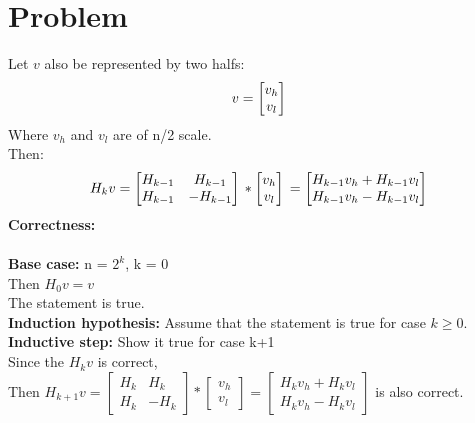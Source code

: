 \documentclass{article}
\begin{document}
\section{Problem \uppercase\expandafter{}}
Let $v$ also be represented by two halfs:\\
$$
v =
\begin{bmatrix}
    v_{h}\\
    v_{l}
\end{bmatrix}\\
$$
Where $v_h$ and $v_l$ are of n/2 scale.\\
Then:\\
$$
H_kv = 
\begin{bmatrix}
    H_{k-1} & H_{k-1}\\
    H_{k-1} & -H_{k-1} 
\end{bmatrix}\\
*
\begin{bmatrix}
    v_{h}\\
    v_{l}
\end{bmatrix}\\
=
\begin{bmatrix}
    H_{k-1}v_{h}+H_{k-1}v_{l}\\
    H_{k-1}v_{h}-H_{k-1}v_{l}
\end{bmatrix}\\
$$
\textbf{\large Correctness:}\\\\
\textbf{Base case:} n = $2^k$, k = 0\\
Then $H_0 v = v$\\
The statement is true.\\
\textbf{Induction hypothesis:} Assume that the statement is true for case $k\ge 0$.\\
\textbf{Inductive step:} Show it true for case k+1\\
Since the $H_k v$ is correct,\\
Then $H_{k+1} v = \begin{bmatrix}
    H_{k} & H_{k}\\
    H_{k} & -H_{k} 
\end{bmatrix}
*
\begin{bmatrix}
    v_{h}\\
    v_{l}
\end{bmatrix}
=
\begin{bmatrix}
    H_{k}v_{h}+H_{k}v_{l}\\
    H_{k}v_{h}-H_{k}v_{l}
\end{bmatrix}$
is also correct.\\
\end{document}
